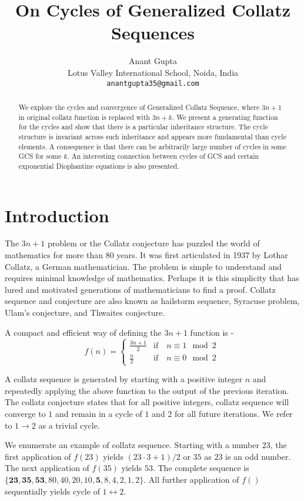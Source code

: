 \documentclass[12pt]{article} %
\title{On Cycles of Generalized Collatz Sequences}
\author{\small Anant Gupta\\ 
    \small Lotus Valley International School, Noida, India\\
    \small \texttt{anantgupta35@gmail.com}}
\date{}
\begin{document}
\maketitle
\begin{abstract}
    We explore the cycles and convergence of Generalized Collatz Sequence, where $3n+1$ in original collatz function is replaced with $3n+k$. We present a generating function for the cycles and  show that there is a particular inheritance structure. The cycle structure is invariant across such inheritance and appears more fundamental than cycle elements. A consequence is that there can be arbitrarily large number of cycles in some GCS for some $k$. An interesting connection between cycles of GCS and certain exponential Diophantine equations is also presented.
\end{abstract}

\section{Introduction}

The $3n+1$ problem or the Collatz conjecture has puzzled the world of mathematics for more than 80 years. It was first articulated in 1937 by Lothar Collatz, a German mathematician. The problem is simple to understand and requires minimal knowledge of mathematics. Perhaps it is this simplicity that has lured and motivated generations of mathematicians to find a proof. Collatz sequence and conjecture are also known as hailstorm sequence, Syracuse problem, Ulam's conjecture, and Thwaites conjecture.

A compact and efficient way of defining the $3n+1$ function is  -
\begin{equation*}
f(n)= \begin{cases} 
     \frac{3n+1}{2} & \text{if} \quad n \equiv 1 \mod 2\ \\
      \frac{n}{2}   & \text{if} \quad n \equiv 0 \mod 2\
   \end{cases}
\end{equation*}

A collatz sequence is generated by starting with a positive integer $n$ and repeatedly applying the above function to the output of the previous iteration. The collatz conjecture states that for all positive integers, collatz sequence will converge to $1$ and remain in a cycle of $1$ and $2$ for all future iterations. We refer to $1 \rightarrow 2$ as a trivial cycle.

We enumerate an example of collatz sequence. Starting with a number $23$, the first application of $f(23)$ yields $(23 \cdot 3 + 1)/2$ or $35$ as $23$ is an odd number. The next application of $f(35)$  yields $53$. The complete sequence is \\ $\{ \mathbf{23},\mathbf{35},\mathbf{53},80, 40, 20, 10, \mathbf{5},8, 4 , 2, 1, 2 \}$. All further application of $f()$ sequentially yields cycle of $1 \leftrightarrow  2$. 
\end{document}
